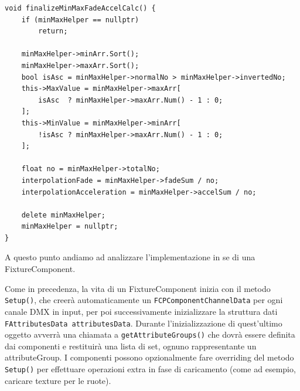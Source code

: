 \documentclass[main.tex]{subfiles}
\begin{document}
\begin{lstlisting}
void finalizeMinMaxFadeAccelCalc() {
    if (minMaxHelper == nullptr)
        return;
    
    minMaxHelper->minArr.Sort();
    minMaxHelper->maxArr.Sort();
    bool isAsc = minMaxHelper->normalNo > minMaxHelper->invertedNo;
    this->MaxValue = minMaxHelper->maxArr[
        isAsc  ? minMaxHelper->maxArr.Num() - 1 : 0;
    ];
    this->MinValue = minMaxHelper->minArr[
        !isAsc ? minMaxHelper->maxArr.Num() - 1 : 0;
    ];

    float no = minMaxHelper->totalNo;
    interpolationFade = minMaxHelper->fadeSum / no;
    interpolationAcceleration = minMaxHelper->accelSum / no;

    delete minMaxHelper;
    minMaxHelper = nullptr;
}
\end{lstlisting}

A questo punto andiamo ad analizzare l'implementazione in se di una FixtureComponent.\newline

Come in precedenza, la vita di un FixtureComponent inizia con il metodo \lstinline{Setup()}, che creerà automaticamente un \lstinline{FCPComponentChannelData} per ogni canale DMX in input, per poi successivamente inizializzare la struttura dati \lstinline{FAttributesData attributesData}. Durante l'inizializzazione di quest'ultimo oggetto avverrà una chiamata a \lstinline{getAttributeGroups()} che dovrà essere definita dai componenti e restituirà una lista di set, ognuno rappresentante un attributeGroup. I componenti possono opzionalmente fare overriding del metodo \lstinline{Setup()} per effettuare operazioni extra in fase di caricamento (come ad esempio, caricare texture per le ruote).
\end{document}
